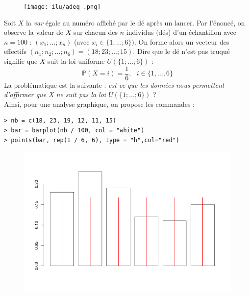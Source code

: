 


\begin{figure}[H]\begin{center}\texttt{[image: ilu/adeq .png]}\end{center}\end{figure}



Soit $X$ la \textit{var} égale au numéro affiché par le dé après un lancer. Par l’énoncé, on observe la valeur de $X$ sur chacun des $n$ individus (dés) d’un échantillon avec $n = 100$ : $(x_{1}; \dots ; x_{n})$ (avec $x_{i} \in \{1; \dots ; 6\})$. On forme alors un vecteur des effectifs $(n_{1}; n_{2}; \dots ; n_{6}) = (18; 23; \dots ; 15)$.\newline
Dire que le dé n’est pas truqué signifie que $X$ suit la loi uniforme $\mathit{U}(\{1; \dots ; 6\})$ :
$$\mathbb{P}(X=i) = \frac{1}{6}, \textrm{ } i \in \{1,\dots, 6\}$$
La problématique est la suivante : \textit{est-ce que les données nous permettent d’affirmer que X ne suit pas la loi $\mathit{U}(\{1; \dots ; 6\})$} ?\newline
\\
Ainsi, pour une analyse graphique, on propose les commandes :
\begin{lstlisting}[language=html]
> nb = c(18, 23, 19, 12, 11, 15)
> bar = barplot(nb / 100, col = "white")
> points(bar, rep(1 / 6, 6), type = "h",col="red")
\end{lstlisting}
\begin{figure}[H]\begin{center}\includegraphics[scale=1]{ilu/adeq14.png}\end{center}\end{figure}
